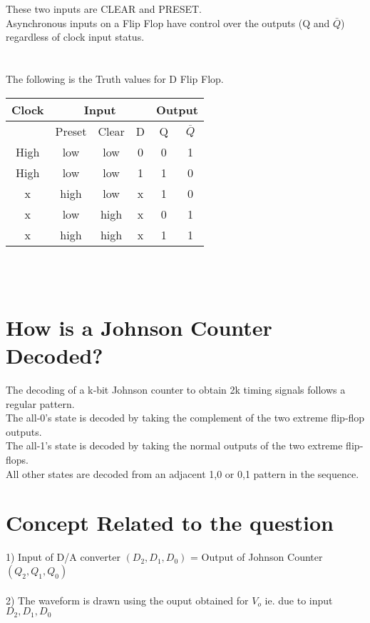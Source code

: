 \documentclass{article}
\begin{document}
These two inputs are CLEAR and PRESET.\\
Asynchronous inputs on a Flip Flop have control over the outputs (Q and $\bar{Q}$) regardless of clock input status.\\\\\\
The following is the Truth values for D Flip Flop.
\begin{center}
\begin{tabular}{ |c|c|c|c|c|c| }
\hline
{Clock}&\multicolumn{3}{|c|}{Input}&\multicolumn{2}{|c|}{Output}\\
\hline
 &Preset&Clear&D&Q&$\overline{Q}$\\
\hline
High&low&low&0&0&1\\
High&low&low&1&1&0\\
x&high&low&x&1&0\\
x&low&high&x&0&1\\
x&high&high&x&1&1\\
\hline
\end{tabular}
\end{center}
\\\\
\section {How is a Johnson Counter Decoded?}
The decoding of a k‐bit Johnson counter to obtain 2k timing signals follows a regular pattern.\\ The all‐0’s state is decoded by taking the complement of the two extreme flip‐flop outputs.\\ The all‐1’s state is decoded by taking the normal outputs of the two extreme flip‐flops.\\ All other states are decoded from an adjacent 1,0 or 0,1 pattern in the sequence.\\

\section {Concept Related to the question}
1) Input of D/A converter $(D_2,D_1,D_0)$ =  Output of Johnson Counter $(Q_2,Q_1,Q_0)$\\\\
2) The waveform is drawn using the ouput obtained for $V_o$ ie. due to input $D_2,D_1,D_0$
\\
\end{document}
